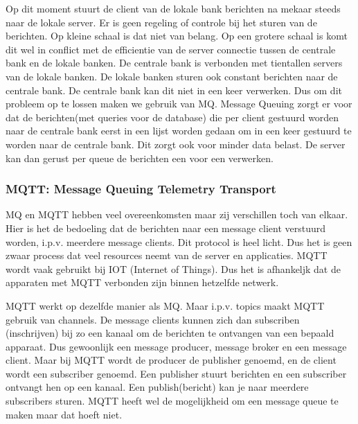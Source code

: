 \documentclass{article}
\begin{document}
Op dit moment stuurt de client van de lokale bank berichten na mekaar steeds naar de lokale server.
Er is geen regeling of controle bij het sturen van de berichten.
Op kleine schaal is dat niet van belang.
Op een grotere schaal is komt dit wel in conflict met de efficientie van
de server connectie tussen de centrale bank en de lokale banken.
De centrale bank is verbonden met tientallen servers van de lokale banken.
De lokale banken sturen ook constant berichten naar de centrale bank.
De centrale bank kan dit niet in een keer verwerken.
Dus om dit probleem op te lossen maken we gebruik van MQ.
Message Queuing zorgt er voor dat de berichten(met queries voor de database)
die per client gestuurd worden naar de centrale bank eerst in een lijst worden gedaan
om in een keer gestuurd te worden naar de centrale bank.
Dit zorgt ook voor minder data belast.
De server kan dan gerust per queue de berichten een voor een verwerken.


\subsubsection{MQTT: Message Queuing Telemetry Transport}
MQ en MQTT hebben veel overeenkomsten maar zij verschillen toch van elkaar.
Hier is het de bedoeling dat de berichten naar een message client verstuurd worden,
i.p.v. meerdere message clients.
Dit protocol is heel licht.
Dus het is geen zwaar process dat veel resources neemt van de server en applicaties.
MQTT wordt vaak gebruikt bij IOT (Internet of Things).
Dus het is afhankeljk dat de apparaten met MQTT verbonden zijn binnen hetzelfde netwerk.

MQTT werkt op dezelfde manier als MQ.
Maar i.p.v. topics maakt MQTT gebruik van channels.
De message clients kunnen zich dan subscriben (inschrijven) bij zo een kanaal
om de berichten te ontvangen van een bepaald apparaat.
Dus gewoonlijk een message producer, message broker
en een message client.
Maar bij MQTT wordt de producer de publisher genoemd,
en de client wordt een subscriber genoemd.
Een publisher stuurt berichten en een subscriber ontvangt hen op een kanaal.
Een publish(bericht) kan je naar meerdere subscribers sturen.
MQTT heeft wel de mogelijkheid om een message queue te maken maar dat hoeft niet.
\end{document}
